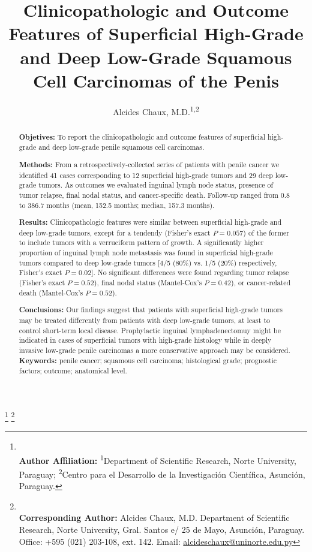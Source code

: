 \documentclass[11pt,letterpaper]{article}\usepackage[]{graphicx}\usepackage[]{color}
\title{\textbf{Clinicopathologic and Outcome Features of Superficial High-Grade and Deep Low-Grade Squamous Cell Carcinomas of the Penis}}
\author{Alcides Chaux, M.D.\textsuperscript{1,2}}
\date{}
\begin{document}
\maketitle

\begin{abstract}

\textbf{Objetives:} To report the clinicopathologic and outcome features of superficial high-grade and deep low-grade penile squamous cell carcinomas.

\textbf{Methods:} From a retrospectively-collected series of patients with penile cancer we identified 41 cases corresponding to 12 superficial high-grade tumors and 29 deep low-grade tumors. As outcomes we evaluated inguinal lymph node status, presence of tumor relapse, final nodal status, and cancer-specific death. Follow-up ranged from 0.8 to 386.7 months (mean, 152.5 months; median, 157.3 months).

\textbf{Results:} Clinicopathologic features were similar between superficial high-grade and deep low-grade tumors, except for a tendendy (Fisher's exact $P=0.057$) of the former to include tumors with a verruciform pattern of growth. A significantly higher proportion of inguinal lymph node metastasis was found in superficial high-grade tumors compared to deep low-grade tumors [4/5 (80\%) vs. 1/5 (20\%) respectively, Fisher's exact $P=0.02$]. No significant differences were found regarding tumor relapse (Fisher's exact $P=0.52$), final nodal status (Mantel-Cox's $P=0.42$), or cancer-related death (Mantel-Cox's $P=0.52$).

\textbf{Conclusions:} Our findings suggest that patients with superficial high-grade tumors may be treated differently from patients with deep low-grade tumors, at least to control short-term local disease. Prophylactic inguinal lymphadenectomuy might be indicated in cases of superficial tumors with high-grade histology while in deeply invasive low-grade penile carcinomas a more conservative approach may be considered.\\

\textbf{Keywords:} penile cancer; squamous cell carcinoma; histological grade; prognostic factors; outcome; anatomical level.

\end{abstract}

\let\thefootnote\relax\footnote{
\\ \textbf{Author Affiliation:} \textsuperscript{1}Department of Scientific Research, Norte University, Paraguay; \textsuperscript{2}Centro para el Desarrollo de la Investigación Científica, Asunción, Paraguay.
}
\let\thefootnote\relax\footnote{
\\ \textbf{Corresponding Author:} Alcides Chaux, M.D. Department of Scientific Research, Norte University, Gral. Santos e/ 25 de Mayo, Asunción, Paraguay. Office: +595 (021) 203-108, ext. 142. Email: \href{mailto:alcideschaux@uninorte.edu.py}{alcideschaux@uninorte.edu.py}
}
\end{document}
